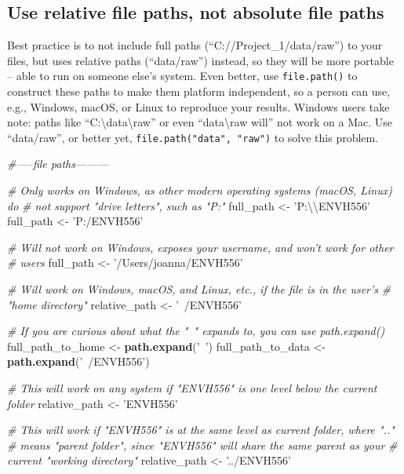 \documentclass[
]{article}
\newenvironment{Shaded}{\begin{snugshade}}{\end{snugshade}}
\newcommand{\CharTok}[1]{\textcolor[rgb]{0.31,0.60,0.02}{#1}}
\newcommand{\CommentTok}[1]{\textcolor[rgb]{0.56,0.35,0.01}{\textit{#1}}}
\newcommand{\KeywordTok}[1]{\textcolor[rgb]{0.13,0.29,0.53}{\textbf{#1}}}
\newcommand{\NormalTok}[1]{#1}
\newcommand{\StringTok}[1]{\textcolor[rgb]{0.31,0.60,0.02}{#1}}
\begin{document}
\hypertarget{use-relative-file-paths-not-absolute-file-paths}{%
\subsection{Use relative file paths, not absolute file
paths}\label{use-relative-file-paths-not-absolute-file-paths}}

Best practice is to not include full paths (``C://Project\_1/data/raw'')
to your files, but uses relative paths (``data/raw'') instead, so they
will be more portable -- able to run on someone else's system. Even
better, use \texttt{file.path()} to construct these paths to make them
platform independent, so a person can use, e.g., Windows, macOS, or
Linux to reproduce your results. Windows users take note: paths like
``C:\textbackslash data\textbackslash raw'' or even
``data\textbackslash raw will'' not work on a Mac. Use ``data/raw'', or
better yet, \texttt{file.path("data",\ "raw")} to solve this problem.

\begin{Shaded}
\begin{Highlighting}[]
\CommentTok{#-----file paths---------}

\CommentTok{# Only works on Windows, as other modern operating systems (macOS, Linux) do }
\CommentTok{# not support "drive letters", such as "P:"}
\NormalTok{full_path <-}\StringTok{ 'P:}\CharTok{\textbackslash{}\textbackslash{}}\StringTok{ENVH556'}
\NormalTok{full_path <-}\StringTok{ 'P:/ENVH556'}

\CommentTok{# Will not work on Windows, exposes your username, and won't work for other }
\CommentTok{# users}
\NormalTok{full_path <-}\StringTok{ '/Users/joanna/ENVH556'}

\CommentTok{# Will work on Windows, macOS, and Linux, etc., if the file is in the user's}
\CommentTok{# "home directory"}
\NormalTok{relative_path <-}\StringTok{ '~/ENVH556'}

\CommentTok{# If you are curious about what the "~" expands to, you can use path.expand()}
\NormalTok{full_path_to_home <-}\StringTok{ }\KeywordTok{path.expand}\NormalTok{(}\StringTok{'~'}\NormalTok{)}
\NormalTok{full_path_to_data <-}\StringTok{ }\KeywordTok{path.expand}\NormalTok{(}\StringTok{'~/ENVH556'}\NormalTok{)}

\CommentTok{# This will work on any system if "ENVH556" is one level below the current folder}
\NormalTok{relative_path <-}\StringTok{ 'ENVH556'}

\CommentTok{# This will work if "ENVH556" is at the same level as current folder, where ".."}
\CommentTok{# means "parent folder", since "ENVH556" will share the same parent as your }
\CommentTok{# current "working directory"}
\NormalTok{relative_path <-}\StringTok{ '../ENVH556'}
\end{Highlighting}
\end{Shaded}
\end{document}
